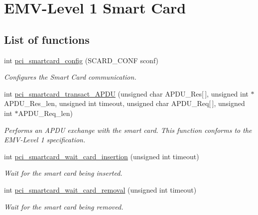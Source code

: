 \hypertarget{group__pcibx__sc}{}\section{E\+M\+V-\/\+Level 1 Smart Card}
\label{group__pcibx__sc}
\subsection*{List of functions}
\begin{DoxyCompactItemize}
\item 
int \hyperlink{group__pcibx__sc_gac227636b4a270677ea489d54bfa9262e}{pci\+\_\+smartcard\+\_\+config} (S\+C\+A\+R\+D\+\_\+\+C\+O\+NF sconf)
\begin{DoxyCompactList}\small\item\em Configures the Smart Card communication. \end{DoxyCompactList}\item 
int \hyperlink{group__pcibx__sc_gaa97512bc1e0389c8528b90e2d2d05ad0}{pci\+\_\+smartcard\+\_\+transact\+\_\+\+A\+P\+DU} (unsigned char A\+P\+D\+U\+\_\+\+Res\mbox{[}$\,$\mbox{]}, unsigned int $\ast$A\+P\+D\+U\+\_\+\+Res\+\_\+len, unsigned int timeout, unsigned char A\+P\+D\+U\+\_\+\+Req\mbox{[}$\,$\mbox{]}, unsigned int $\ast$A\+P\+D\+U\+\_\+\+Req\+\_\+len)
\begin{DoxyCompactList}\small\item\em Performs an A\+P\+DU exchange with the smart card. This function conforms to the E\+M\+V-\/\+Level 1 specification. \end{DoxyCompactList}\item 
int \hyperlink{group__pcibx__sc_gad022b65b3032486431f926be08dc58ba}{pci\+\_\+smartcard\+\_\+wait\+\_\+card\+\_\+insertion} (unsigned int timeout)
\begin{DoxyCompactList}\small\item\em Wait for the smart card being inserted. \end{DoxyCompactList}\item 
int \hyperlink{group__pcibx__sc_gab0d9d214315edba6757eb7a56508e7fb}{pci\+\_\+smartcard\+\_\+wait\+\_\+card\+\_\+removal} (unsigned int timeout)
\begin{DoxyCompactList}\small\item\em Wait for the smart card being removed. \end{DoxyCompactList}\end{DoxyCompactItemize}



